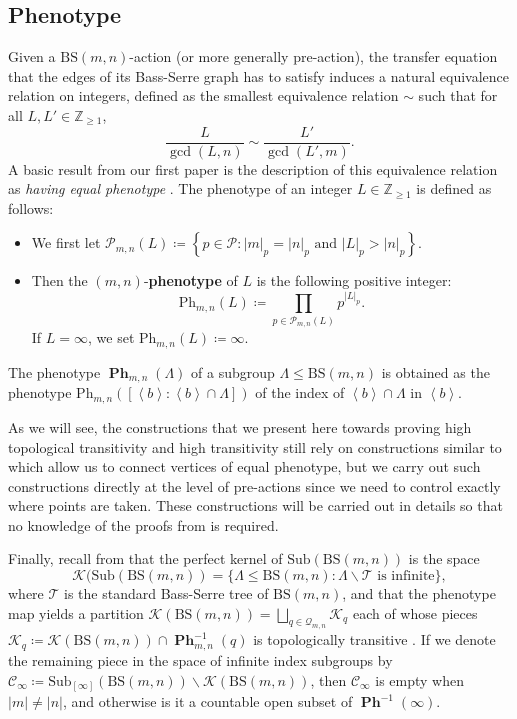 \documentclass[12pt]{article}
\numberwithin{equation}{section}
\theoremstyle{definition}
\def\defin#1{\textbf{#1}}
\newcommand{\Z}{\mathbb{Z}}
\newcommand{\inv}{^{-1}}
\newcommand{\la}{\left\langle}
\newcommand{\ra}{\right\rangle}
\newcommand{\abs}[1]{\left\lvert #1\right\rvert}
\newcommand{\PK}{\mathcal{K}}
\newcommand\BSo{\mathrm{BS}}
\newcommand\Phe{\mathrm{Ph}}
\DeclareMathOperator\PHE{\mathbf{Ph}}
\newcommand\primes{\mathcal{P}}
\newcommand{\Sub}{\mathrm{Sub}}
\newcommand\Tree{\mathcal{T}}
\newcommand{\bs}{\backslash}
\begin{document}
\subsection{Phenotype}\label{sec:phenotype}

Given a \( \BSo(m,n) \)-action (or more generally pre-action), the transfer equation 
that the edges of its Bass-Serre graph has to satisfy
induces a natural equivalence relation on integers, defined as the smallest equivalence relation \(\sim\) such that for all \(L,L'\in\Z_ {\geq 1}\), 
\begin{equation}\label{eq:transfer eq rel}
\frac L{\gcd(L,n)}\sim\frac{L'}{\gcd(L',m)}.
\end{equation}
A basic result from our first paper is the description of this equivalence relation 
as \emph{having equal phenotype} \cite[Proposition~4.6]{CGLMS-22}. The phenotype of an integer \( L\in\Z_{\geq 1} \) is defined as follows: 
\begin{itemize}
	\item We first let \(\primes_{m,n}(L)\coloneqq \left\lbrace p\in\primes\colon\abs{m}_p=\abs{n}_p\text{ and }\abs{L}_p>\abs{n}_p\right\rbrace \).
	\item Then the \( (m,n) \)-\defin{phenotype} of \( L \) is the following positive integer:
	\[\Phe_{m,n}(L)\coloneqq \prod_{p\in \primes_{m,n}(L)} p^{\abs{L}_p}.\]
	If \(L=\infty\), we set \(\Phe_{m,n}(L)\coloneqq\infty \).
\end{itemize}

The phenotype $\PHE_{m,n}(\Lambda)$ of a subgroup $\Lambda\leq \BSo(m,n)$ is obtained as the phenotype 
$\Phe_{m,n}([\la b\ra : \la b\ra \cap \Lambda])$ of the index of $\la b\ra \cap \Lambda$ in $\la b\ra$. 

As we will see, the constructions that we present here towards proving
high topological transitivity and high transitivity still rely on constructions similar 
to \cite[Theorem~4.17]{CGLMS-22} which allow us to connect vertices of equal phenotype, but we carry out such constructions directly
at the level of pre-actions  since we need to control exactly where points are taken.
These constructions will be carried out in details so that no knowledge of the proofs from \cite{CGLMS-22} is required.

Finally, recall from \cite[Theorem~A]{CGLMS-22} that 
the perfect kernel of \(\Sub(\BSo(m,n))\) is
the space 
\[
\PK(\Sub(\BSo(m,n))=
\{\Lambda\leq \BSo(m,n)\colon \Lambda\bs \Tree\text{ is infinite}\},
\]
where $\Tree$ is the standard Bass-Serre tree of $\BSo(m,n)$,
and that the phenotype map yields a partition 
\(\PK(\BSo(m,n))= \bigsqcup_{q\in\mathcal Q_{m,n}} \PK_q\) each of whose pieces 
\(\PK_q\coloneqq \PK(\BSo(m,n))\cap \PHE_{m,n}\inv(q)\) is  topologically transitive \cite[Theorem~B]{CGLMS-22}. 
If we denote the remaining piece in the space of infinite index subgroups by 
\(\mathcal{C}_{\infty}\coloneqq\Sub_{[\infty]}(\BSo(m,n))\smallsetminus \PK(\BSo(m,n))\),
then \(\mathcal{C}_{\infty}\) is empty when \(\abs{m}\neq\abs{n}\), and otherwise
is it a countable open subset of \(\PHE\inv(\infty)\).
\end{document}
